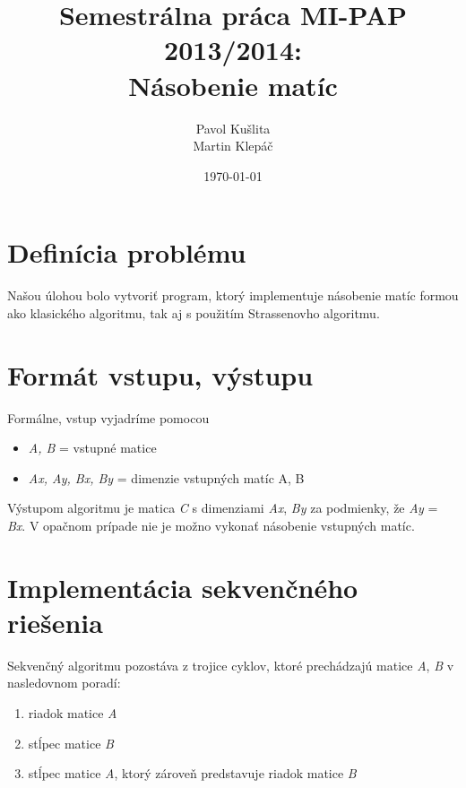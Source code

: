 \documentclass[slovak]{article}
\begin{document}
\title{Semestrálna práca MI-PAP 2013/2014: \\[5mm] Násobenie matíc}
\author{Pavol Kušlita \\[2mm]Martin Klepáč}
\date{\today}

\maketitle

\section{Definícia problému}

Našou úlohou bolo vytvoriť program, ktorý implementuje násobenie matíc formou ako klasického algoritmu, tak aj s použitím Strassenovho algoritmu. 

\section{Formát vstupu, výstupu}

Formálne, vstup vyjadríme pomocou

\begin{itemize}

\item \emph{A, B} = vstupné matice

\item \emph{Ax, Ay, Bx, By} = dimenzie vstupných matíc A, B

\end{itemize}

Výstupom algoritmu je matica \emph{C} s dimenziami \emph{Ax}, \emph{By} za podmienky, že \emph{Ay} = \emph{Bx}. V opačnom prípade nie je možno vykonať násobenie vstupných matíc.


\section{Implementácia sekvenčného riešenia}

Sekvenčný algoritmu pozostáva z trojice cyklov, ktoré prechádzajú matice \emph{A}, \emph{B} v nasledovnom poradí:

\begin{enumerate}

\item riadok matice \emph{A}

\item stĺpec matice \emph{B}

\item stĺpec matice \emph{A}, ktorý zároveň predstavuje riadok matice \emph{B}

\end{enumerate}
\end{document}
